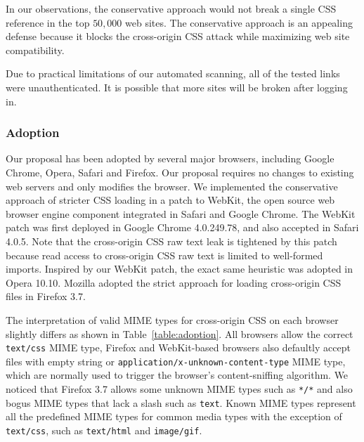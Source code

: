 \documentclass{acm_proc_article-sp}
\begin{document}
In our observations, the conservative approach would not break a single CSS reference in the top $50,000$ web sites. The conservative approach is an appealing defense because it blocks the cross-origin CSS attack while maximizing web site compatibility.

Due to practical limitations of our automated scanning, all of the tested links were unauthenticated. It is possible that more sites will be broken after logging in.

\subsubsection{Adoption}
Our proposal has been adopted by several major browsers, including Google Chrome, Opera, Safari and Firefox. Our proposal requires no changes to existing web servers and only modifies the browser. We implemented the conservative approach of stricter CSS loading in a patch to WebKit, the open source web browser engine component integrated in Safari and Google Chrome. The WebKit patch was first deployed in Google Chrome 4.0.249.78, and also accepted in Safari 4.0.5. Note that the cross-origin CSS raw text leak is tightened by this patch because read access to cross-origin CSS raw text is limited to well-formed imports. Inspired by our WebKit patch, the exact same heuristic was adopted in Opera 10.10. Mozilla adopted the strict approach for loading cross-origin CSS files in Firefox 3.7.

The interpretation of valid MIME types for cross-origin CSS on each browser slightly differs as shown in Table~\ref{table:adoption}. All browsers allow the correct \texttt{text/css} MIME type, Firefox and WebKit-based browsers also defaultly accept files with empty string or \texttt{application/x-unknown-content-type} MIME type, which are normally used to trigger the browser's content-sniffing algorithm. We noticed that Firefox 3.7 allows some unknown MIME types such as \texttt{*/*} and also bogus MIME types that lack a slash such as \texttt{text}. Known MIME types represent all the predefined MIME types for common media types with the exception of \texttt{text/css}, such as \texttt{text/html} and \texttt{image/gif}.
\end{document}
